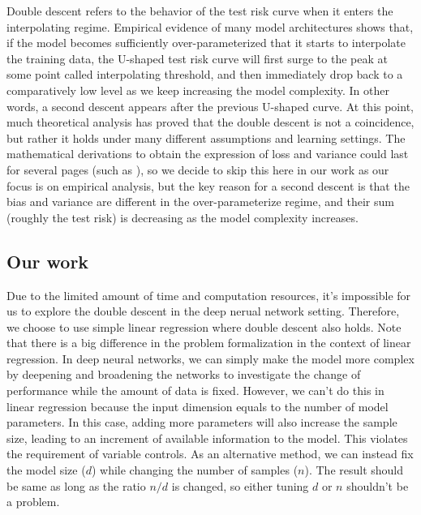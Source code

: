 \documentclass{article}
\begin{document}
\vspace{-3mm}
Double descent refers to the behavior of the test risk curve when it enters the interpolating regime. Empirical evidence of many model architectures shows that, if the model becomes sufficiently over-parameterized that it starts to interpolate the training data, the U-shaped test risk curve will first surge to the peak at some point called interpolating threshold, and then immediately drop back to a comparatively low level as we keep increasing the model complexity. In other words, a second descent appears after the previous U-shaped curve. At this point, much theoretical analysis has proved that the double descent is not a coincidence, but rather it holds under many different assumptions and learning settings. The mathematical derivations to obtain the expression of loss and variance could last for several pages (such as \cite{hastie2022surprises}), so we decide to skip this here in our work as our focus is on empirical analysis, but the key reason for a second descent is that the bias and variance are different in the over-parameterize regime, and their sum (roughly the test risk) is decreasing as the model complexity increases.

\vspace{-2mm}
\subsection{Our work}
\vspace{-1mm}
Due to the limited amount of time and computation resources, it's impossible for us to explore the double descent in the deep nerual network setting. Therefore, we choose to use simple linear regression where double descent also holds. Note that there is a big difference in the problem formalization in the context of linear regression. In deep neural networks, we can simply make the model more complex by deepening and broadening the networks to investigate the change of performance while the amount of data is fixed. However, we can't do this in linear regression because the input dimension equals to the number of model parameters. In this case, adding more parameters will also increase the sample size, leading to an increment of available information to the model. This violates the requirement of variable controls. As an alternative method, we can instead fix the model size ($d$) while changing the number of samples ($n$). The result should be same as long as the ratio $n/d$ is changed, so either tuning $d$ or $n$ shouldn't be a problem.\\
\end{document}
